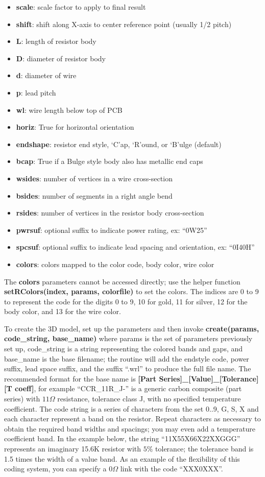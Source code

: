 \documentclass[a4paper, dvipdfm]{article}
\begin{document}
\begin{itemize}
\item\textbf{scale}: scale factor to apply to final result
\item\textbf{shift}: shift along X-axis to center reference point (usually 1/2 pitch)
\item\textbf{L}: length of resistor body
\item\textbf{D}: diameter of resistor body
\item\textbf{d}: diameter of wire
\item\textbf{p}: lead pitch
\item\textbf{wl}: wire length below top of PCB
\item\textbf{horiz}: True for horizontal orientation
\item\textbf{endshape}: resistor end style, `C'ap, `R'ound, or `B'ulge (default)
\item\textbf{bcap}: True if a Bulge style body also has metallic end caps
\item\textbf{wsides}: number of vertices in a wire cross-section
\item\textbf{bsides}: number of segments in a right angle bend
\item\textbf{rsides}: number of vertices in the resistor body cross-section
\item\textbf{pwrsuf}: optional suffix to indicate power rating, ex: ``0W25''
\item\textbf{spcsuf}: optional suffix to indicate lead spacing and orientation, ex: ``0I40H''
\item\textbf{colors}: colors mapped to the color code, body color, wire color
\end{itemize}

The \textbf{colors} parameters cannot be accessed directly; use the helper function
\textbf{setRColors(index, params, colorfile)} to set the colors. The indices are
0 to 9 to represent the code for the digits 0 to 9, 10 for gold, 11 for silver,
12 for the body color, and 13 for the wire color.

To create the 3D model, set up the parameters and then invoke
\textbf{create(params, code\_string, base\_name)} where params is the
set of parameters previously set up, code\_string is a string representing
the colored bands and gaps, and base\_name is the base filename; the
routine will add the endstyle code, power suffix, lead space suffix, and the
suffix ``.wrl'' to produce the full file name. The recommended format for the
base name is \textbf{[Part Series]\_[Value]\_[Tolerance][T coeff]}, for example
``CCR\_11R\_J-'' is a generic carbon composite (part series) with $11\Omega$
resistance, tolerance class J, with no specified temperature coefficient.
The code string is a series of characters from the set 0..9, G, S, X and
each character represent a band on the resistor. Repeat characters as
necessary to obtain the required band widths and spacings; you may even
add a temperature coefficient band. In the example below, the string
``11X55X66X22XXGGG'' represents an imaginary 15.6K resistor with $5\%$
tolerance; the tolerance band is 1.5 times the width of a value band.
As an example of the flexibility of this coding system, you can specify
a $0\Omega$ link with the code ``XXX0XXX''.
\end{document}

